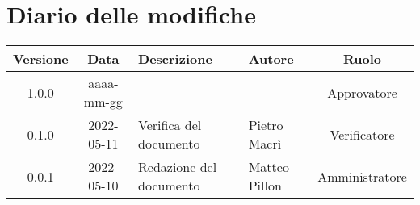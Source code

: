 \section*{Diario delle modifiche}
	\begin{center}
	\renewcommand{\arraystretch}{1.8} %
	\begin{tabular}{ |c|c|m{12em}|m{7em}|c| }
	\hline
	\textbf{Versione} & \textbf{Data} & \textbf{Descrizione} &  \textbf{Autore} &  \textbf{Ruolo} \\ %
	\hline
	1.0.0 & aaaa-mm-gg & & & Approvatore\\
	\hline
	0.1.0 & 2022-05-11 & Verifica del documento & Pietro Macrì & Verificatore\\
	\hline
    0.0.1 & 2022-05-10 & Redazione del documento & Matteo Pillon & Amministratore\\ %
	\hline
	\end{tabular}
	\end{center}
	\newpage